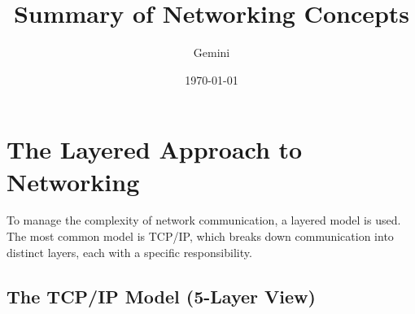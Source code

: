\documentclass{article}
\title{Summary of Networking Concepts}
\author{Gemini}
\date{\today}
\begin{document}
\maketitle

\section{The Layered Approach to Networking}

To manage the complexity of network communication, a layered model is used. The most common model is TCP/IP, which breaks down communication into distinct layers, each with a specific responsibility.

\subsection{The TCP/IP Model (5-Layer View)}
\end{document}
